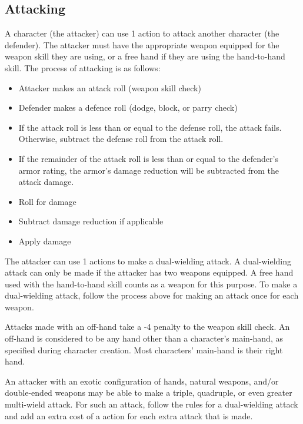 \begin{multicols*}{2}
    \section{Attacking}
    A character (the attacker) can use 1 action to attack another character
    (the defender). The attacker must have the appropriate weapon equipped
    for the weapon skill they are using, or a free hand if they are using
    the hand-to-hand skill. The process of attacking is as follows:
    \begin{itemize}
        \item Attacker makes an attack roll (weapon skill check)
        \item Defender makes a defence roll (dodge, block, or parry check)
        \item If the attack roll is less than or equal to the defense roll, the
                attack fails. Otherwise, subtract the defense roll from the
                attack roll.
        \item If the remainder of the attack roll is less than or equal to the
                defender's armor rating, the armor's damage reduction will be
                subtracted from the attack damage.
        \item Roll for damage
        \item Subtract damage reduction if applicable
        \item Apply damage
    \end{itemize}

    The attacker can use 1 \textonehalf actions to make a dual-wielding
    attack. A dual-wielding attack can only be made if the attacker has
    two weapons equipped. A free hand used with the hand-to-hand skill counts
    as a weapon for this purpose. To make a dual-wielding attack, follow the
    process above for making an attack once for each weapon.

    Attacks made with an off-hand take a -4 penalty to the weapon skill check.
    An off-hand is considered to be any hand other than a character's
    main-hand, as specified during character creation. Most characters'
    main-hand is their right hand.

    An attacker with an exotic configuration of hands, natural weapons,
    and/or double-ended weapons may be able to make a triple, quadruple,
    or even greater multi-wield attack. For such an attack, follow the rules
    for a dual-wielding attack and add an extra cost of a \textonehalf action
    for each extra attack that is made.


\end{multicols*}
